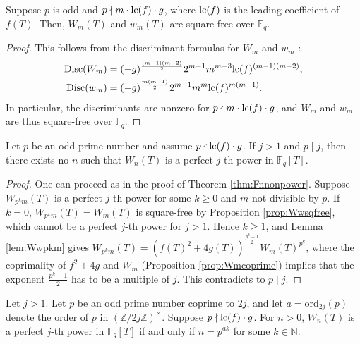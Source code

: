 \begin{proposition}
    \label{prop:Wwsqfree}
    Suppose $p$ is odd and $p \nmid m \cdot \mathrm{lc}(f) \cdot g$, where $\mathrm{lc}(f)$ is the leading coefficient of $f(T)$. Then, $W_m(T)$ and $w_m(T)$ are square-free over $\mathbb{F}_q$.
\end{proposition}

\begin{proof}
    This follows from the discriminant formulas for $W_m$ and $w_m$ \cite[Theorem 4, Theorem 5]{florez2019resultant}:
    \begin{align*}
        \mathrm{Disc}(W_m) &= (-g)^{\frac{(m-1)(m-2)}{2}} 2^{m-1} m^{m-3} \mathrm{lc}(f)^{(m-1)(m-2)}, \\
        \mathrm{Disc}(w_m) &= (-g)^{\frac{m(m-1)}{2}} 2^{m-1} m^{m} \mathrm{lc}(f)^{m(m-1)} \text{.}
    \end{align*}
    In particular, the discriminants are nonzero for $p \nmid m \cdot \mathrm{lc}(f) \cdot g$, and $W_m$ and $w_m$ are thus square-free over $\mathbb{F}_q$.
\end{proof}



\begin{theorem}
    Let $p$ be an odd prime number and assume $p \nmid \mathrm{lc}(f) \cdot g$. If $j > 1$ and $p \mid j$, then there exists no $n$ such that $W_n(T)$ is a perfect $j$-th power in $\mathbb{F}_q[T]$.
\end{theorem}

\begin{proof}
    One can proceed as in the proof of Theorem \ref{thm:Fnnonpower}.
    Suppose $W_{p^km} (T)$ is a perfect $j$-th power for some $k \ge 0$ and $m$ not divisible by $p$.
    If $k = 0$, $W_{p^k m}(T) = W_{m}(T)$ is square-free by Proposition \ref{prop:Wwsqfree}, which cannot be a perfect $j$-th power for $j > 1$.
    Hence $k \ge 1$, and Lemma \ref{lem:Wwpkm} gives $W_{p^k m}(T) = (f(T)^2 + 4g(T))^{\frac{p^k - 1}{2}} W_m(T)^{p^k}$, where the coprimality of $f^2 + 4g$ and $W_m$ (Proposition \ref{prop:Wmcoprime}) implies that the exponent $\frac{p^k - 1}{2}$ has to be a multiple of $j$.
    This contradicts to $p \mid j$.
\end{proof}

\begin{theorem}
    \label{thm:Wn_perfect_power}
    Let $j > 1$. Let $p$ be an odd prime number coprime to $2j$, and let $a = \mathrm{ord}_{2j}(p)$ denote the order of $p$ in $\left( \mathbb{Z}/2j\mathbb{Z} \right)^\times$. Suppose $p \nmid \mathrm{lc}(f) \cdot g$. For $n > 0$, $W_n(T)$ is a perfect $j$-th power in $\mathbb{F}_q[T]$ if and only if $n = p^{ak}$ for some $k \in \mathbb{N}$.
\end{theorem}

